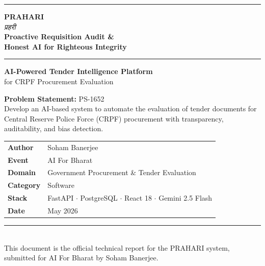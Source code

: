 \documentclass[12pt,a4paper]{article}
\begin{document}

\begin{titlepage}
\centering
\vspace*{2cm}

{\color{prahariblue}\rule{\linewidth}{2pt}}
\vspace{0.5cm}

{\Huge\bfseries\color{prahariblue} PRAHARI}\\[0.3cm]
{\large\color{praharigray}\textit{प्रहरी}}\\[0.3cm]
{\LARGE\bfseries Proactive Requisition Audit \&}\\[0.2cm]
{\LARGE\bfseries Honest AI for Righteous Integrity}\\[0.5cm]

{\color{prahariblue}\rule{\linewidth}{1pt}}
\vspace{0.8cm}

{\large\bfseries AI-Powered Tender Intelligence Platform}\\[0.2cm]
{\large for CRPF Procurement Evaluation}

\vspace{1.2cm}

\begin{tcolorbox}[colback=noteblue, colframe=noteblueborder, boxrule=0.5pt, arc=4pt,
    left=12pt, right=12pt, top=8pt, bottom=8pt, width=0.82\linewidth]
\centering
\textbf{Problem Statement:} PS-1652 \\[4pt]
\small Develop an AI-based system to automate the evaluation of tender documents for
Central Reserve Police Force (CRPF) procurement with transparency, auditability,
and bias detection.
\end{tcolorbox}

\vspace{1.2cm}

\begin{tabular}{ll}
\textbf{Author}     & Soham Banerjee \\[4pt]
\textbf{Event}      & AI For Bharat \\[4pt]
\textbf{Domain}     & Government Procurement \& Tender Evaluation \\[4pt]
\textbf{Category}   & Software \\[4pt]
\textbf{Stack}      & FastAPI $\cdot$ PostgreSQL $\cdot$ React 18 $\cdot$ Gemini 2.5 Flash \\[4pt]
\textbf{Date}       & May 2026 \\
\end{tabular}

\vfill

{\color{prahariblue}\rule{\linewidth}{1pt}}\\[0.3cm]
{\small\color{praharigray}This document is the official technical report for the PRAHARI system,
submitted for AI For Bharat by Soham Banerjee.}

\end{titlepage}
\end{document}
